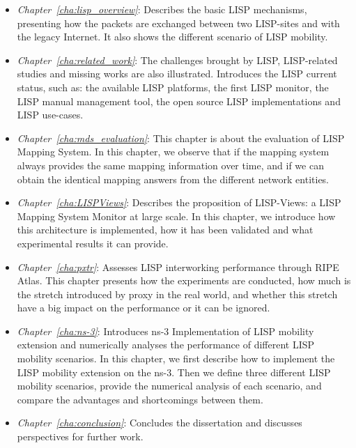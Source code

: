 \begin{itemize}[noitemsep,topsep=0pt]
	\item \emph{Chapter~\ref{cha:lisp_overview}}: Describes the basic LISP mechanisms, presenting how the packets are exchanged between two LISP-sites and with the legacy Internet. It also shows the different scenario of LISP mobility.
	\item \emph{Chapter~\ref{cha:related_work}}: The challenges brought by LISP, LISP-related studies and missing works are also illustrated. Introduces the LISP current status, such as: the available LISP platforms, the first LISP monitor, the LISP manual management tool, the open source LISP implementations and LISP use-cases.
    \item \emph{Chapter~\ref{cha:mds_evaluation}}: This chapter is about the evaluation of LISP Mapping System. In this chapter, we observe that if the mapping system always provides the same mapping information over time, and if we can obtain the identical mapping answers from the different network entities.
    \item \emph{Chapter~\ref{cha:LISPViews}}: Describes the proposition of LISP-Views: a LISP Mapping System Monitor at large scale. In this chapter, we introduce how this architecture is implemented, how it has been validated and what experimental results it can provide.
    \item \emph{Chapter~\ref{cha:pxtr}}: Assesses LISP interworking performance through RIPE Atlas. This chapter presents how the experiments are conducted, how much is the stretch introduced by proxy in the real world, and whether this stretch have a big impact on the performance or it can be ignored.
    \item \emph{Chapter~\ref{cha:ns-3}}: Introduces ns-3 Implementation of LISP mobility extension and numerically analyses the performance of different LISP mobility scenarios. In this chapter, we first describe how to implement the LISP mobility extension on the ns-3. Then we define three different LISP mobility scenarios, provide the numerical analysis of each scenario, and compare the advantages and shortcomings between them. 
    \item \emph{Chapter~\ref{cha:conclusion}}: Concludes the dissertation and discusses perspectives for further work.
\end{itemize}